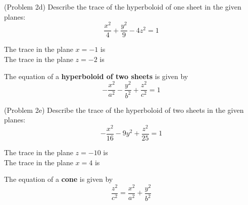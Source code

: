 \documentclass[handout]{ximera}
\begin{document}
\begin{image}
\end{image}


\begin{center}
\end{center}




\begin{problem}(Problem 2d)
Describe the trace of the hyperboloid of one sheet in the given planes:
\[
\frac{x^2}{4} + \frac{y^2}{9} - 4z^2 = 1
\]

The trace in the plane $x = -1$ is \\
The trace in the plane $z = -2$ is \\
\end{problem}

The equation of a \textbf{hyperboloid of two sheets} is given by 
\[
-\frac{x^2}{a^2} -\frac{y^2}{b^2} + \frac{z^2}{c^2} = 1
\]


\begin{center}
\end{center}




\begin{problem}(Problem 2e)
Describe the trace of the hyperboloid of two sheets in the given planes:
\[
-\frac{x^2}{16} - 9y^2 + \frac{z^2}{25} = 1
\]

The trace in the plane $z = -10$ is \\
The trace in the plane $x = 4$ is 
\end{problem}



The equation of a \textbf{cone} is given by 
\[
\frac{z^2}{c^2} = \frac{x^2}{a^2} + \frac{y^2}{b^2}
\]

\begin{center}
\end{center}
\end{document}
